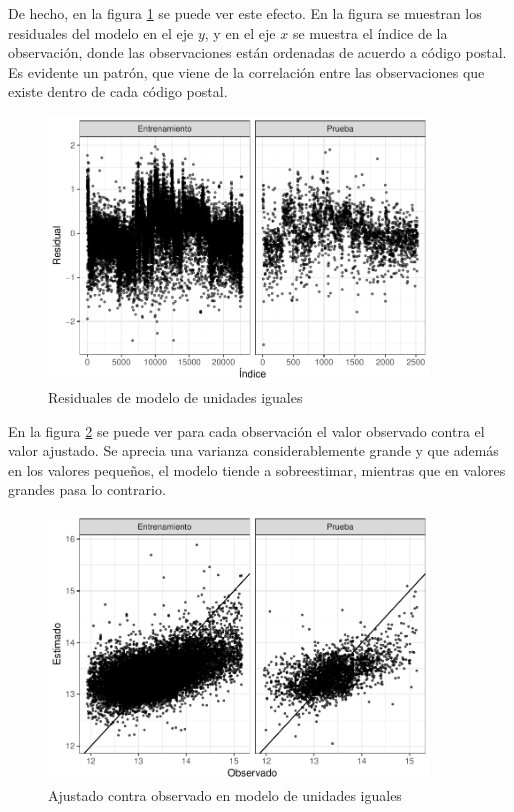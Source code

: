 De hecho, en la figura \ref{fig:comp_pooling_resids} se puede ver este efecto. En la figura se muestran los residuales del modelo en el eje $y$, y en el eje $x$ se muestra el índice de la observación, donde las observaciones están ordenadas de acuerdo a código postal. Es evidente un patrón, que viene de la correlación entre las observaciones que existe dentro de cada código postal.

\begin{figure}[H]
    \centering
    \includegraphics[width=0.9\textwidth]{images/comp_pooling_resids.pdf}
    \caption{Residuales de modelo de unidades iguales}
    \label{fig:comp_pooling_resids}
\end{figure}

En la figura \ref{fig:comp_pooling_obs_vs_pred} se puede ver para cada observación el valor observado contra el valor ajustado. Se aprecia una varianza considerablemente grande y que además en los valores pequeños, el modelo tiende a sobreestimar, mientras que en valores grandes pasa lo contrario.

\begin{figure}[H]
    \centering
    \includegraphics[width=0.9\textwidth]{images/comp_pooling_obs_vs_pred.pdf}
    \caption{Ajustado contra observado en modelo de unidades iguales}
    \label{fig:comp_pooling_obs_vs_pred}
\end{figure}

